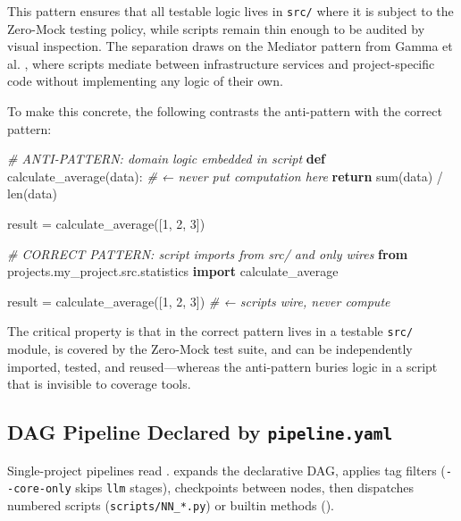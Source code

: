 \documentclass[
  english,
]{article}
\newenvironment{Shaded}{}{}
\newcommand{\BuiltInTok}[1]{\textcolor[rgb]{0.00,0.50,0.00}{#1}}
\newcommand{\CommentTok}[1]{\textcolor[rgb]{0.38,0.63,0.69}{\textit{#1}}}
\newcommand{\ControlFlowTok}[1]{\textcolor[rgb]{0.00,0.44,0.13}{\textbf{#1}}}
\newcommand{\DecValTok}[1]{\textcolor[rgb]{0.25,0.63,0.44}{#1}}
\newcommand{\ImportTok}[1]{\textcolor[rgb]{0.00,0.50,0.00}{\textbf{#1}}}
\newcommand{\KeywordTok}[1]{\textcolor[rgb]{0.00,0.44,0.13}{\textbf{#1}}}
\newcommand{\NormalTok}[1]{#1}
\newcommand{\OperatorTok}[1]{\textcolor[rgb]{0.40,0.40,0.40}{#1}}
\begin{document}
This pattern ensures that all testable logic lives in \texttt{src/}
where it is subject to the Zero-Mock testing policy, while scripts
remain thin enough to be audited by visual inspection. The separation
draws on the Mediator pattern from Gamma et al. \citep{gamma1995design},
where scripts mediate between infrastructure services and
project-specific code without implementing any logic of their own.

To make this concrete, the following contrasts the anti-pattern with the
correct pattern:

\begin{Shaded}
\begin{Highlighting}[]
\CommentTok{\# ANTI{-}PATTERN: domain logic embedded in script}
\KeywordTok{def}\NormalTok{ calculate\_average(data):          }\CommentTok{\# ← never put computation here}
    \ControlFlowTok{return} \BuiltInTok{sum}\NormalTok{(data) }\OperatorTok{/} \BuiltInTok{len}\NormalTok{(data)}

\NormalTok{result }\OperatorTok{=}\NormalTok{ calculate\_average([}\DecValTok{1}\NormalTok{, }\DecValTok{2}\NormalTok{, }\DecValTok{3}\NormalTok{])}

\CommentTok{\# CORRECT PATTERN: script imports from src/ and only wires}
\ImportTok{from}\NormalTok{ projects.my\_project.src.statistics }\ImportTok{import}\NormalTok{ calculate\_average}

\NormalTok{result }\OperatorTok{=}\NormalTok{ calculate\_average([}\DecValTok{1}\NormalTok{, }\DecValTok{2}\NormalTok{, }\DecValTok{3}\NormalTok{])  }\CommentTok{\# ← scripts wire, never compute}
\end{Highlighting}
\end{Shaded}

The critical property is that  in the correct
pattern lives in a testable \texttt{src/} module, is covered by the
Zero-Mock test suite, and can be independently imported, tested, and
reused---whereas the anti-pattern buries logic in a script that is
invisible to coverage tools.

\newpage

\subsection{\texorpdfstring{DAG Pipeline Declared by
\texttt{pipeline.yaml}}{DAG Pipeline Declared by pipeline.yaml}}\label{dag-pipeline-declared-by-pipeline.yaml}

Single-project pipelines read
.
 expands the declarative
DAG, applies tag filters (\texttt{-\/-core-only} skips \texttt{llm}
stages), checkpoints between nodes, then dispatches numbered scripts
(\texttt{scripts/NN\_*.py}) or builtin methods
().
\end{document}

